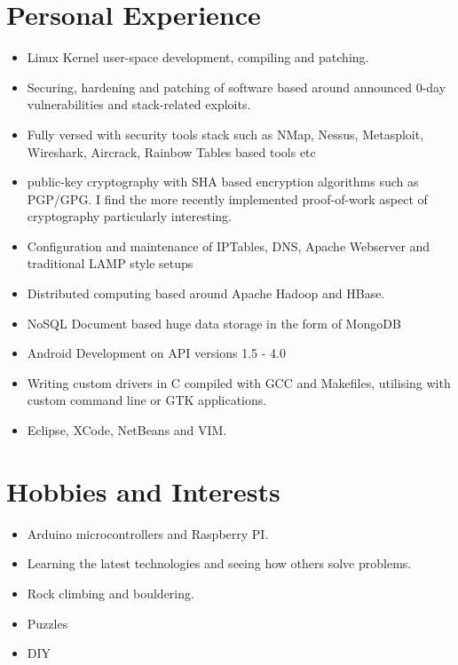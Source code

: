 \documentclass[a4paper,10pt]{moderncv}
\begin{document}
\section{Personal Experience}
\begin{itemize}
\item Linux Kernel user-space development, compiling and patching.
\item Securing, hardening and patching of software based around announced 0-day vulnerabilities and stack-related exploits.
\item Fully versed with security tools stack such as NMap, Nessus, Metasploit, Wireshark, Aircrack, Rainbow Tables based tools etc
\item public-key cryptography with SHA based encryption algorithms such as PGP/GPG. I find the more recently implemented proof-of-work aspect of cryptography particularly interesting.
\item Configuration and maintenance of IPTables, DNS, Apache Webserver and traditional LAMP style setups
\item Distributed computing based around Apache Hadoop and HBase.
\item NoSQL Document based huge data storage in the form of MongoDB
\item Android Development on API versions 1.5 - 4.0
\item Writing custom drivers in C compiled with GCC and Makefiles, utilising with custom command line or GTK applications.
\item Eclipse, XCode, NetBeans and VIM.
\end{itemize}

\section{Hobbies and Interests}
\begin{itemize}
\item Arduino microcontrollers and Raspberry PI.
\item Learning the latest technologies and seeing how others solve problems.
\item Rock climbing and bouldering.
\item Puzzles
\item DIY
\end{itemize}
\end{document}
